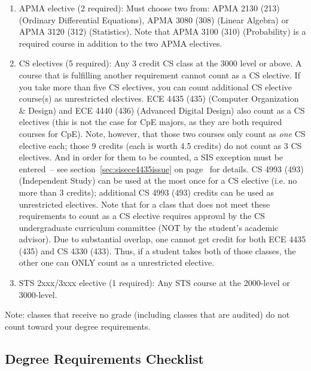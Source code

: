 \documentclass[10pt,letter]{book}
\begin{document}
\begin{enumerate}
\item APMA elective (2 required): Must choose two from: APMA 2130
  (213) (Ordinary Differential Equations), APMA 3080 (308) (Linear
  Algebra) or APMA 3120 (312) (Statistics). Note that APMA 3100 (310)
  (Probability) is a required course in addition to the two APMA
  electives.

\item CS electives (5 required): Any 3 credit CS class at the 3000
  level or above. A course that is fulfilling another requirement
  cannot count as a CS elective. If you take more than five CS
  electives, you can count additional CS elective course(s) as
  unrestricted electives. ECE 4435 (435) (Computer Organization \&
  Design) and ECE 4440 (436) (Advanced Digital Design) also count as a
  CS electives (this is not the case for CpE majors, as they are both
  required courses for CpE). Note, however, that those two courses
  only count as {\em one} CS elective each; those 9 credits (each is
  worth 4.5 credits) do not count as 3 CS electives.  And in order for
  them to be counted, a SIS exception must be entered~-- see
  section~\ref{sec:sisece4435issue} on
  page~\pageref{sec:sisece4435issue} for details.  CS 4993 (493)
  (Independent Study) can be used at the most once for a CS elective
  (i.e. no more than 3 credits); additional CS 4993 (493) credits can
  be used as unrestricted electives. Note that for a class that does
  not meet these requirements to count as a CS elective requires
  approval by the CS undergraduate curriculum committee (NOT by the
  student's academic advisor). Due to substantial overlap, one cannot
  get credit for both ECE 4435 (435) and CS 4330 (433). Thus, if a
  student takes both of those classes, the other one can ONLY count as
  a unrestricted elective.

\item STS 2xxx/3xxx elective (1 required): Any STS course at the
  2000-level or 3000-level.
\end{enumerate}
 
Note: classes that receive no grade (including classes that are
audited) do not count toward your degree requirements.

\clearpage
\subsection{Degree Requirements Checklist}
\end{document}
